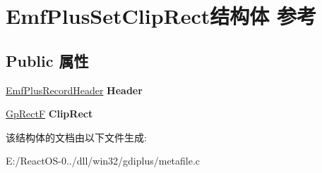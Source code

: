 \hypertarget{struct_emf_plus_set_clip_rect}{}\section{Emf\+Plus\+Set\+Clip\+Rect结构体 参考}
\label{struct_emf_plus_set_clip_rect}
\subsection*{Public 属性}
\begin{DoxyCompactItemize}
\item 
\mbox{\label{struct_emf_plus_set_clip_rect_a6d3aada168255d809f93df74b464d7f2}} 
\hyperlink{struct_emf_plus_record_header}{Emf\+Plus\+Record\+Header} {\bfseries Header}
\item 
\mbox{\label{struct_emf_plus_set_clip_rect_a9c470f66a48796c81d7a54f06a32cda6}} 
\hyperlink{struct_rect_f}{Gp\+RectF} {\bfseries Clip\+Rect}
\end{DoxyCompactItemize}


该结构体的文档由以下文件生成\+:\begin{DoxyCompactItemize}
\item 
E\+:/\+React\+O\+S-\/0../dll/win32/gdiplus/metafile.\+c\end{DoxyCompactItemize}
